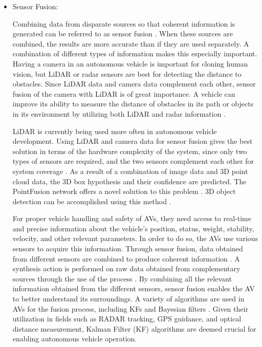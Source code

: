 \documentclass[a4paper,12pt]{article}
\begin{document}
\begin{itemize}
\item Sensor Fusion:


\hspace{5mm} Combining data from disparate sources so that coherent information is generated can be referred to as sensor fusion \cite{article30}. When these sources are combined, the results are more accurate than if they are used separately. A combination of different types of information makes this especially important. Having a camera in an autonomous vehicle is important for cloning human vision, but LiDAR or radar sensors are best for detecting the distance to obstacles. Since LiDAR data and camera data complement each other, sensor fusion of the camera with LiDAR is of great importance. A vehicle can improve its ability to measure the distance of obstacles in its path or objects in its environment by utilizing both LiDAR and radar information \cite{article30}.

\hspace{5mm} LiDAR is currently being used more often in autonomous vehicle development. Using LiDAR and camera data for sensor fusion gives the best solution in terms of the hardware complexity of the system, since only two types of sensors are required, and the two sensors complement each other for system coverage \cite{article30}. As a result of a combination of image data and 3D point cloud data, the 3D box hypothesis and their confidence are predicted. The PointFusion network offers a novel solution to this problem \cite{article30}. 3D object detection can be accomplished using this method \cite{article30}.


\hspace{5mm} For proper vehicle handling and safety of AVs, they need access to real-time and precise information about the vehicle's position, status, weight, stability, velocity, and other relevant parameters. In order to do so, the AVs use various sensors to acquire this information. Through sensor fusion, data obtained from different sensors are combined to produce coherent information \cite{article24}. A synthesis action is performed on raw data obtained from complementary sources through the use of the process \cite{article24}. By combining all the relevant information obtained from the different sensors, sensor fusion enables the AV to better understand its surroundings. A variety of algorithms are used in AVs for the fusion process, including KFs and Bayesian filters \cite{article24}. Given their utilization in fields such as RADAR tracking, GPS guidance, and optical distance measurement, Kalman Filter (KF) algorithms are deemed crucial for enabling autonomous vehicle operation.


\end{itemize}
\end{document}

